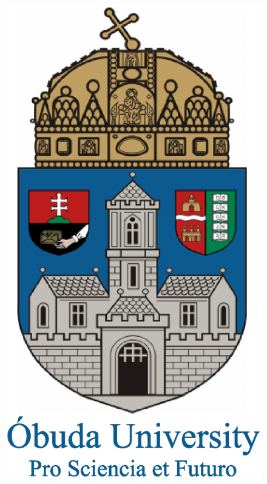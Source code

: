 \documentclass[a4paper,10pt]{article}
\title{}
\author{Kuti József}
\begin{document}
	\normalsize
	
	\begin{figure}
\centering
\includegraphics[width=0.7\linewidth]{logos-1}
\end{figure}
\end{document}
